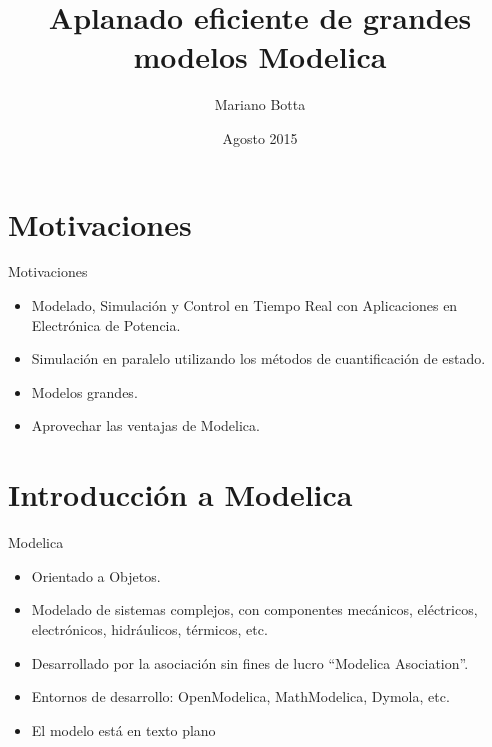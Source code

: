 \documentclass[aspectratio=169,10pt]{beamer}
\title{Aplanado eficiente de grandes modelos Modelica}
\author[M.Botta] {Mariano Botta }
\institute[UNR] %
{ FCEIA, UNR }
\date {Agosto 2015}
\begin{document}
\begin{frame}
  \titlepage
\end{frame}

 
\section{Motivaciones}  

\begin{frame}{Motivaciones}
    \begin{itemize}
     \item Modelado, Simulación y Control en Tiempo Real con Aplicaciones en Electrónica de Potencia.
     \item Simulación en paralelo utilizando los métodos de cuantificación de estado.  
     \item Modelos grandes.
     \item Aprovechar las ventajas de Modelica.
    \end{itemize}
\end{frame}

\section{Introducción a Modelica}

\begin{frame}{Modelica} 
    \begin{itemize}
        \item Orientado a Objetos.
        \item Modelado de sistemas complejos, con componentes mecánicos, eléctricos, electrónicos, hidráulicos, térmicos, etc.     
        \item Desarrollado por la asociación sin fines de lucro ``Modelica Asociation''.
        \item Entornos de desarrollo: OpenModelica, MathModelica, Dymola, etc.
        
        \item El modelo está en texto plano
    \end{itemize}
\end{frame}
 
\end{document}
